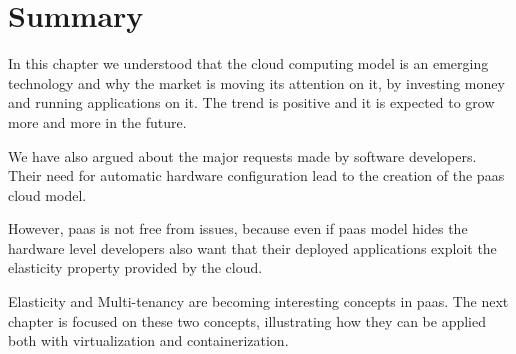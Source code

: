 %
%
\section{Summary}
\label{sec:problemSpace-summary}
In this chapter we understood that the cloud computing model is an emerging technology and why the market
is moving its attention on it, by investing money and running applications on it. The trend is positive
and it is expected to grow more and more in the future.

We have also argued about the major requests made by software developers. Their need for automatic
hardware configuration lead to the creation of the \ac{paas} cloud model.

However, \ac{paas} is not free from issues, because even if \ac{paas} model hides the hardware level
developers also want that their deployed applications exploit the elasticity property provided by the
cloud.

Elasticity and Multi-tenancy are becoming interesting concepts in \ac{paas}. The next chapter is focused
on these two concepts, illustrating how they can be applied both with virtualization and containerization.